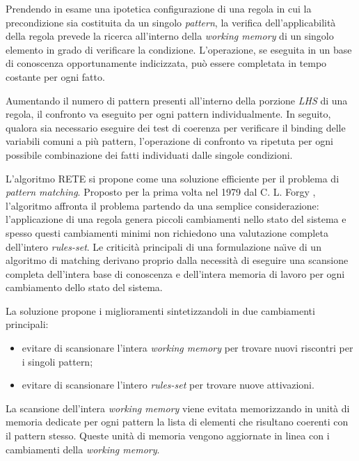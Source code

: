 Prendendo in esame una ipotetica configurazione di una regola in cui la precondizione sia costituita da un singolo \emph{pattern}, la verifica dell'applicabilità della regola prevede la ricerca all'interno della \emph{working memory} di un singolo elemento in grado di verificare la condizione. L'operazione, se eseguita in un base di conoscenza opportunamente indicizzata, può essere completata in tempo costante per ogni fatto. \cite{russellnorvig2009}

Aumentando il numero di pattern presenti all'interno della porzione \emph{LHS} di una regola, il confronto va eseguito per ogni pattern individualmente. In seguito, qualora sia necessario eseguire dei test di coerenza per verificare il binding delle variabili comuni a più pattern, l'operazione di confronto va ripetuta per ogni possibile combinazione dei fatti individuati dalle singole condizioni.

L'algoritmo RETE si propone come una soluzione efficiente per il problema di \emph{pattern matching}. Proposto per la prima volta nel 1979 dal C. L. Forgy \cite{forgy1979} \cite{forgy1982}, l'algoritmo affronta il problema partendo da una semplice considerazione: l'applicazione di una regola genera piccoli cambiamenti nello stato del sistema e spesso questi cambiamenti minimi non richiedono una valutazione completa dell'intero \emph{rules-set}. Le criticità principali di una formulazione na\"{\i}ve di un algoritmo di matching derivano proprio dalla necessità di eseguire una scansione completa dell'intera base di conoscenza e dell'intera memoria di lavoro per ogni cambiamento dello stato del sistema.

La soluzione propone i miglioramenti sintetizzandoli in due cambiamenti principali:
\begin{itemize}
	\item evitare di scansionare l'intera \emph{working memory} per trovare nuovi riscontri per i singoli pattern;
	\item evitare di scansionare l'intero \emph{rules-set} per trovare nuove attivazioni.
\end{itemize}

La scansione dell'intera \emph{working memory} viene evitata memorizzando in unità di memoria dedicate per ogni pattern la lista di elementi che risultano coerenti con il pattern stesso. Queste unità di memoria vengono aggiornate in linea con i cambiamenti della \emph{working memory}.

